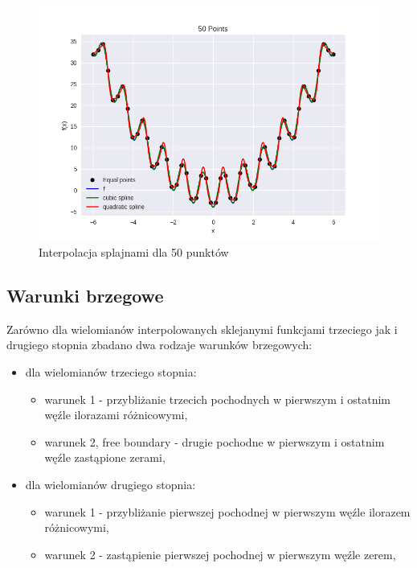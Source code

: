 \documentclass{article}
\begin{document}
\begin{figure}[H]
    \centering
    \includegraphics[width=\textwidth]{img/spline_50.png}
    \caption{Interpolacja splajnami dla 50 punktów}
\end{figure}

\subsection{Warunki brzegowe}
Zarówno dla wielomianów interpolowanych sklejanymi funkcjami trzeciego jak i drugiego stopnia zbadano dwa rodzaje warunków brzegowych:
\begin{itemize}
    \item
    dla wielomianów trzeciego stopnia:
    \begin{itemize}
        \item
        warunek 1 - przybliżanie trzecich pochodnych w pierwszym i ostatnim węźle ilorazami różnicowymi,
        \item
        warunek 2, free boundary - drugie pochodne w pierwszym i ostatnim węźle zastąpione zerami,
    \end{itemize}
    \item
    dla wielomianów drugiego stopnia:
    \begin{itemize}
        \item
        warunek 1 - przybliżanie pierwszej pochodnej w pierwszym węźle ilorazem różnicowymi,
        \item
        warunek 2 - zastąpienie pierwszej pochodnej w pierwszym węźle zerem,
    \end{itemize}
\end{itemize}
\end{document}
